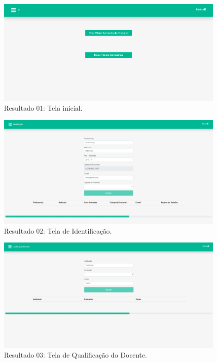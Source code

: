 \begin{figure}[htb]
    \centering
    \includegraphics[width=.99\textwidth]{img/pagina_inicial.PNG}
    \caption[Resultado 01: Tela inicial]{Resultado 01: Tela inicial.}
    \label{fig:result01}
\end{figure}

\begin{figure}[htb]
    \centering
    \includegraphics[width=.99\textwidth]{img/pagina_identificacao.PNG}
    \caption[Resultado 02: Tela de Identificação]{Resultado 02: Tela de Identificação.}
    \label{fig:result02}
\end{figure}

\begin{figure}[htb]
    \centering
    \includegraphics[width=.8\textwidth]{img/pagina_qualificacao_docente.PNG}
    \caption[Resultado 03: Tela de Qualificação do Docente]{Resultado 03: Tela de Qualificação do Docente.}
    \label{fig:result03}
\end{figure}


